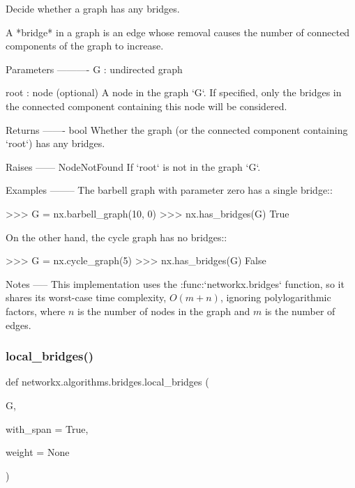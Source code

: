 \begin{DoxyVerb}Decide whether a graph has any bridges.

A *bridge* in a graph is an edge whose removal causes the number of
connected components of the graph to increase.

Parameters
----------
G : undirected graph

root : node (optional)
   A node in the graph `G`. If specified, only the bridges in the
   connected component containing this node will be considered.

Returns
-------
bool
   Whether the graph (or the connected component containing `root`)
   has any bridges.

Raises
------
NodeNotFound
   If `root` is not in the graph `G`.

Examples
--------
The barbell graph with parameter zero has a single bridge::

    >>> G = nx.barbell_graph(10, 0)
    >>> nx.has_bridges(G)
    True

On the other hand, the cycle graph has no bridges::

    >>> G = nx.cycle_graph(5)
    >>> nx.has_bridges(G)
    False

Notes
-----
This implementation uses the :func:`networkx.bridges` function, so
it shares its worst-case time complexity, $O(m + n)$, ignoring
polylogarithmic factors, where $n$ is the number of nodes in the
graph and $m$ is the number of edges.\end{DoxyVerb}
 \mbox{\label{namespacenetworkx_1_1algorithms_1_1bridges_aaf2dd80601be11dfa98ebbfbc260fa47}} 
\subsubsection{\texorpdfstring{local\+\_\+bridges()}{local\_bridges()}}
{\footnotesize\ttfamily def networkx.\+algorithms.\+bridges.\+local\+\_\+bridges (\begin{DoxyParamCaption}\item[{}]{G,  }\item[{}]{with\+\_\+span = {\ttfamily True},  }\item[{}]{weight = {\ttfamily None} }\end{DoxyParamCaption})}

